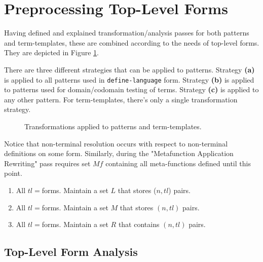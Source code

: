 \section{Preprocessing Top-Level Forms}

Having defined and explained transformation/analysis passes for both patterns and term-templates, these are combined according to the needs of top-level forms. They are depicted in Figure \ref{transform-pipeline}. 

There are three different strategies that can be applied to patterns. Strategy \textbf{(a)} is applied to all patterns used in \texttt{define-language} form. Strategy \textbf{(b)} is applied to patterns used for domain/codomain testing of terms. Strategy \textbf{(c)} is applied to any other pattern. For term-templates, there's only a single transformation strategy.

\begin{figure}[ht]
\centering
	\caption{Transformations applied to patterns and term-templates.}
	\label{transform-pipeline}
\end{figure}


Notice that non-terminal resolution occurs with respect to non-terminal definitions on some \DefineLanguageNoArg form. Similarly, during the "Metafunction Application Rewriting" pass requires set $Mf$ containing all meta-functions defined until this point. 

\begin{enumerate}
\item All $tl=$\TlDefineLanguage \space forms. Maintain a set $L$ that stores ($n, tl$) pairs.
\item All $tl=$\TlDefineMetafunction \space forms. Maintain a set $M$ that stores $(n, tl)$ pairs.
\item All $tl=$\TlDefineReductionRelation \space forms. Maintain a set $R$ that contains $(n, tl)$ pairs.
\end{enumerate}

\subsection{Top-Level Form Analysis}


